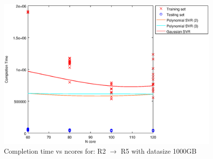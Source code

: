 
\begin {figure}[hbtp]
\centering
\includegraphics[width=\textwidth]{output/R2_R5_1000_ALL_FEATURES/plot_R2_R5_1000_bestmodels.eps}
\caption{Completion time vs ncores for: R2 $\rightarrow$ R5 with datasize 1000GB}
\label{fig:coreonly_linear_R2_R5_1000}
\end {figure}
